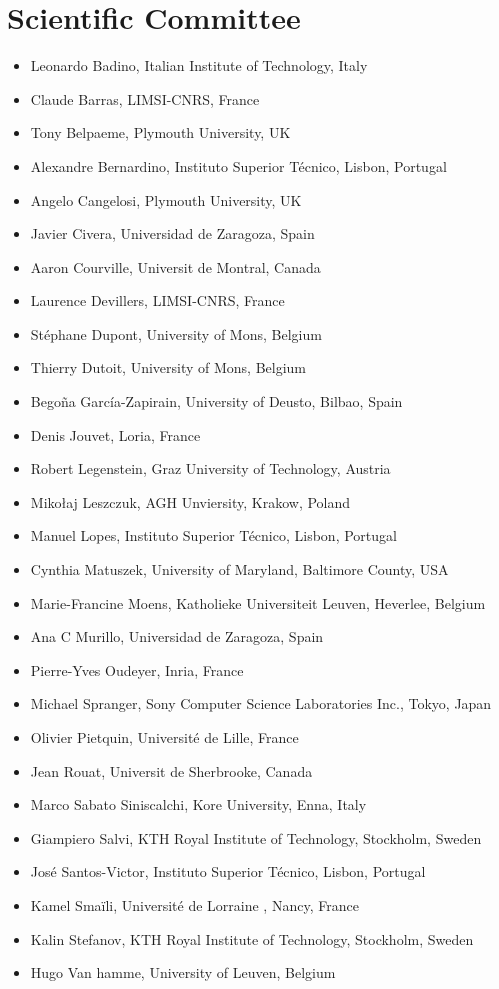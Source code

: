 \documentclass{confproc}
\begin{document}
\section*{Scientific Committee}
\begin{itemize}
\item Leonardo Badino, Italian Institute of Technology, Italy
\item Claude Barras, LIMSI-CNRS, France
\item Tony Belpaeme, Plymouth University, UK
\item Alexandre Bernardino, Instituto Superior Técnico, Lisbon, Portugal
\item Angelo Cangelosi, Plymouth University, UK
\item Javier Civera, Universidad de Zaragoza, Spain
\item Aaron Courville, Universit de Montral, Canada
\item Laurence Devillers, LIMSI-CNRS, France
\item Stéphane Dupont, University of Mons, Belgium
\item Thierry Dutoit, University of Mons, Belgium
\item Begoña García-Zapirain, University of Deusto, Bilbao, Spain
\item Denis Jouvet, Loria, France
\item Robert Legenstein, Graz University of Technology, Austria
\item Mikołaj Leszczuk, AGH Unviersity, Krakow, Poland
\item Manuel Lopes, Instituto Superior Técnico, Lisbon, Portugal
\item Cynthia Matuszek, University of Maryland, Baltimore County, USA
\item Marie-Francine Moens, Katholieke Universiteit Leuven, Heverlee, Belgium
\item Ana C Murillo, Universidad de Zaragoza, Spain
\item Pierre-Yves Oudeyer, Inria, France
\item Michael Spranger, Sony Computer Science Laboratories Inc., Tokyo, Japan
\item Olivier Pietquin, Université de Lille, France
\item Jean Rouat, Universit de Sherbrooke, Canada
\item Marco Sabato Siniscalchi, Kore University, Enna, Italy
\item Giampiero Salvi, KTH Royal Institute of Technology, Stockholm, Sweden
\item José Santos-Victor, Instituto Superior Técnico, Lisbon, Portugal
\item Kamel Smaïli, Université de Lorraine , Nancy, France
\item Kalin Stefanov, KTH Royal Institute of Technology, Stockholm, Sweden
\item Hugo Van hamme, University of Leuven, Belgium
\end{itemize}
\newpage
\tableofcontents
\end{document}

